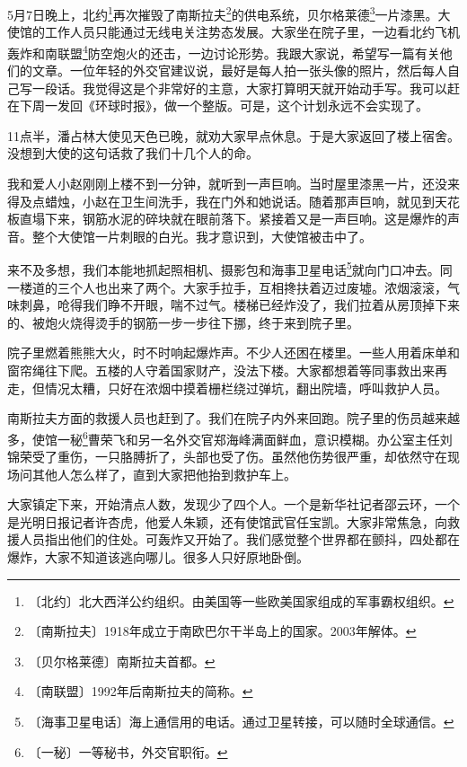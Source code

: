 \documentclass[12pt,UTF-8,openany]{ctexbook}
\begin{document}
\begin{large}
    
    5月7日晚上，北约\footnote{〔北约〕北大西洋公约组织。由美国等一些欧美国家组成的军事霸权组织。}再次摧毁了南斯拉夫\footnote{〔南斯拉夫〕1918年成立于南欧巴尔干半岛上的国家。2003年解体。}的供电系统，贝尔格莱德\footnote{〔贝尔格莱德〕南斯拉夫首都。}一片漆黑。大使馆的工作人员只能通过无线电关注势态发展。大家坐在院子里，一边看北约飞机轰炸和南联盟\footnote{〔南联盟〕1992年后南斯拉夫的简称。}防空炮火的还击，一边讨论形势。我跟大家说，希望写一篇有关他们的文章。一位年轻的外交官建议说，最好是每人拍一张头像的照片，然后每人自己写一段话。我觉得这是个非常好的主意，大家打算明天就开始动手写。我可以赶在下周一发回《环球时报》，做一个整版。可是，这个计划永远不会实现了。
    
    11点半，潘占林大使见天色已晚，就劝大家早点休息。于是大家返回了楼上宿舍。没想到大使的这句话救了我们十几个人的命。
    
    我和爱人小赵刚刚上楼不到一分钟，就听到一声巨响。当时屋里漆黑一片，还没来得及点蜡烛，小赵在卫生间洗手，我在门外和她说话。随着那声巨响，就见到天花板直塌下来，钢筋水泥的碎块就在眼前落下。紧接着又是一声巨响。这是爆炸的声音。整个大使馆一片刺眼的白光。我才意识到，大使馆被击中了。
    
    来不及多想，我们本能地抓起照相机、摄影包和海事卫星电话\footnote{〔海事卫星电话〕海上通信用的电话。通过卫星转接，可以随时全球通信。}就向门口冲去。同一楼道的三个人也出来了两个。大家手拉手，互相搀扶着迈过废墟。浓烟滚滚，气味刺鼻，呛得我们睁不开眼，喘不过气。楼梯已经炸没了，我们拉着从房顶掉下来的、被炮火烧得烫手的钢筋一步一步往下挪，终于来到院子里。
    
    院子里燃着熊熊大火，时不时响起爆炸声。不少人还困在楼里。一些人用着床单和窗帘绳往下爬。五楼的人守着国家财产，没法下楼。大家都想着等同事救出来再走，但情况太糟，只好在浓烟中摸着栅栏绕过弹坑，翻出院墙，呼叫救护人员。
    
    南斯拉夫方面的救援人员也赶到了。我们在院子内外来回跑。院子里的伤员越来越多，使馆一秘\footnote{〔一秘〕一等秘书，外交官职衔。}曹荣飞和另一名外交官郑海峰满面鲜血，意识模糊。办公室主任刘锦荣受了重伤，一只胳膊折了，头部也受了伤。虽然他伤势很严重，却依然守在现场问其他人怎么样了，直到大家把他抬到救护车上。
    
    大家镇定下来，开始清点人数，发现少了四个人。一个是新华社记者邵云环，一个是光明日报记者许杏虎，他爱人朱颖，还有使馆武官任宝凯。大家非常焦急，向救援人员指出他们的住处。可轰炸又开始了。我们感觉整个世界都在颤抖，四处都在爆炸，大家不知道该逃向哪儿。很多人只好原地卧倒。
    

\end{large}
\end{document}
